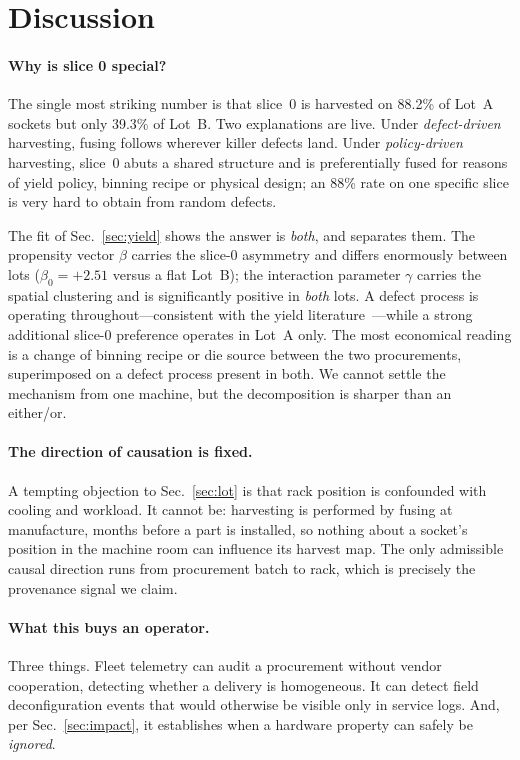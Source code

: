 \documentclass[10pt,conference]{IEEEtran}
\begin{document}
\section{Discussion}
\paragraph{Why is slice 0 special?} The single most striking number is that slice~0 is harvested on
88.2\% of Lot~A sockets but only 39.3\% of Lot~B. Two explanations are live. Under
\emph{defect-driven} harvesting, fusing follows wherever killer defects land. Under
\emph{policy-driven} harvesting, slice~0 abuts a shared structure and is preferentially fused for
reasons of yield policy, binning recipe or physical design; an 88\% rate on one specific slice is
very hard to obtain from random defects.

The fit of Sec.~\ref{sec:yield} shows the answer is \emph{both}, and separates them. The
propensity vector $\beta$ carries the slice-0 asymmetry and differs enormously between lots
($\beta_0=+2.51$ versus a flat Lot~B); the interaction parameter $\gamma$ carries the spatial
clustering and is significantly positive in \emph{both} lots. A defect process is operating
throughout---consistent with the yield literature~\cite{koren1993negbinom,bae2007waferyield}---while
a strong additional slice-0 preference operates in Lot~A only. The most economical reading is a
change of binning recipe or die source between the two procurements, superimposed on a defect
process present in both. We cannot settle the mechanism from one machine, but the decomposition is
sharper than an either/or.

\paragraph{The direction of causation is fixed.} A tempting objection to Sec.~\ref{sec:lot} is that
rack position is confounded with cooling and workload. It cannot be: harvesting is performed by
fusing at manufacture, months before a part is installed, so nothing about a socket's position in
the machine room can influence its harvest map. The only admissible causal direction runs from
procurement batch to rack, which is precisely the provenance signal we claim.

\paragraph{What this buys an operator.} Three things. Fleet telemetry can audit a procurement
without vendor cooperation, detecting whether a delivery is homogeneous. It can detect field
deconfiguration events that would otherwise be visible only in service logs. And, per
Sec.~\ref{sec:impact}, it establishes when a hardware property can safely be \emph{ignored}.
\end{document}
